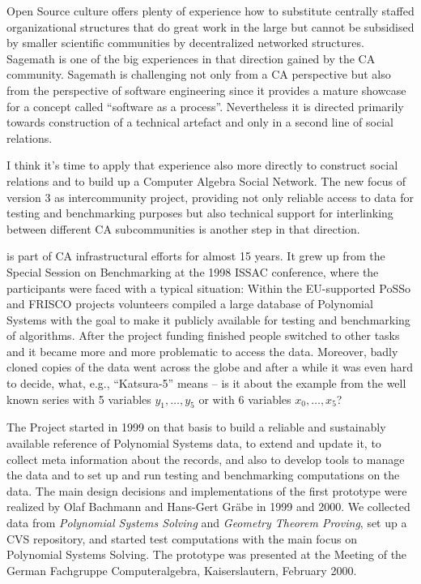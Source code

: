 \documentclass[a4paper,11pt]{article}
\begin{document}
\begin{multicols}{2}
Open Source culture offers plenty of experience how to substitute centrally
staffed organizational structures that do great work in the large but cannot
be subsidised by smaller scientific communities by decentralized networked
structures.  Sagemath \cite{Sagemath} is one of the big experiences in that
direction gained by the CA community.  Sagemath is challenging not only from a
CA perspective but also from the perspective of software engineering since it
provides a mature showcase for a concept called ``software as a process''.
Nevertheless it is directed primarily towards construction of a technical
artefact and only in a second line of social relations.

I think it's time to apply that experience also more directly to construct
social relations and to build up a Computer Algebra Social Network.  The new
focus of {\SD} version 3 as intercommunity project, providing not only
reliable access to data for testing and benchmarking purposes but also
technical support for interlinking between different CA subcommunities is
another step in that direction.


{\SD} is part of CA infrastructural efforts for almost 15 years.  It grew up
from the Special Session on Benchmarking at the 1998 ISSAC conference, where
the participants were faced with a typical situation: Within the EU-supported
PoSSo \cite{PoSSo} and FRISCO \cite{FRISCO} projects volunteers compiled a
large database of Polynomial Systems with the goal to make it publicly
available for testing and benchmarking of algorithms.  After the project
funding finished people switched to other tasks and it became more and more
problematic to access the data. Moreover, badly cloned copies of the data went
across the globe and after a while it was even hard to decide, what, e.g.,
``Katsura-5'' means -- is it about the example from the well known series with
5 variables $y_1,\dots,y_5$ or with 6 variables $x_0,\dots,x_5$?

The {\SD} Project started in 1999 on that basis to build a reliable and
sustainably available reference of Polynomial Systems data, to extend and
update it, to collect meta information about the records, and also to develop
tools to manage the data and to set up and run testing and benchmarking
computations on the data. The main design decisions and implementations of the
first prototype were realized by Olaf Bachmann and Hans-Gert Gr\"abe in 1999
and 2000. We collected data from \emph{Polynomial Systems Solving} and
\emph{Geometry Theorem Proving}, set up a CVS repository, and started test
computations with the main focus on Polynomial Systems Solving. The prototype
was presented at the Meeting of the German Fachgruppe Computeralgebra,
Kaiserslautern, February 2000.


\end{multicols}
\end{document}
